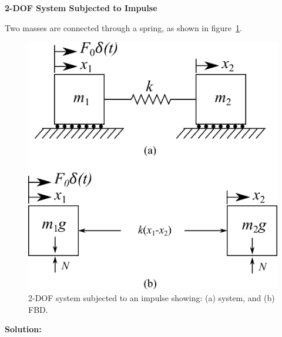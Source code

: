 \documentclass[12pt,letter]{article}
\begin{document}
	
	\begin{example}
	\textbf{2-DOF System Subjected to Impulse}
	
	\noindent Two masses are connected through a spring, as shown in figure~\ref{fig:2-DOF-spring_mass_free}. 
	\begin{figure}[H]
		\centering
		\includegraphics[]{../figures/2-DOF-spring_mass_free.png}
		\caption{2-DOF system subjected to an impulse showing: (a) system, and (b) FBD.}
		\label{fig:2-DOF-spring_mass_free}
	\end{figure}

\noindent \textbf{Solution:}


\end{example}
\end{document}
